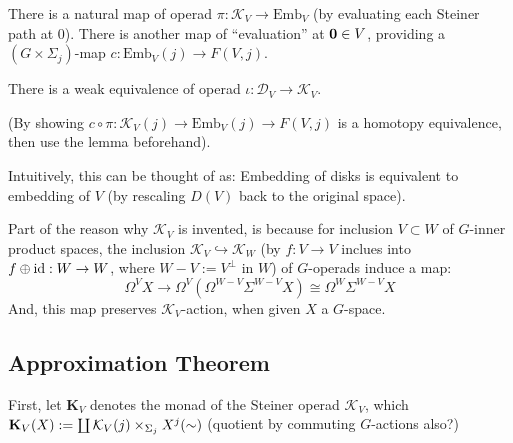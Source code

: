 \documentclass{article}
\begin{document}
\hfil

There is a natural map of operad $\pi:\mathcal{K}_V\rightarrow\text{Emb}_V$ (by evaluating each Steiner path at $0$). There is another map of ``evaluation'' at $\mathbf{0}\in V$, providing a $(G\times \Sigma_j)$-map $c:\text{Emb}_V (j)\rightarrow F(V,j)$.

\begin{thm}
There is a weak equivalence of operad $\iota:\mathcal{D}_V\rightarrow\mathcal{K}_V$.

(By showing $c\circ \pi:\mathcal{K}_V (j)\rightarrow\text{Emb}_V (j)\rightarrow F(V,j)$ is a homotopy equivalence, then use the lemma beforehand).
\end{thm}

Intuitively, this can be thought of as: Embedding of disks is equivalent to embedding of $V$ (by rescaling $D(V)$ back to the original space).

\hfil

Part of the reason why $\mathcal{K}_V$ is invented, is because for inclusion $V\subset W$ of $G$-inner product spaces, the inclusion $\mathcal{K}_V\hookrightarrow \mathcal{K}_W$ (by $f:V\rightarrow V$ inclues into $f\oplus \mathrm{id}:W\rightarrow W$, where $W-V:= V^\perp$ in $W$) of $G$-operads induce a map:
\[\Omega^V X \rightarrow \Omega^V\left(\Omega^{W-V}\Sigma^{W-V}X\right)\cong \Omega^W\Sigma^{W-V}X\]
And, this map preserves $\mathcal{K}_V$-action, when given $X$ a $G$-space.

\hfil

\hfil

\subsection{Approximation Theorem}

First, let $\mathbf{K}_V$ denotes the monad of the Steiner operad $\mathcal{K}_V$, which $\mathbf{K}_V (X):= \coprod \mathcal{K}_V (j)\times_{\Sigma_j}X^j\/(\sim)$ (quotient by commuting $G$-actions also?)
\end{document}
